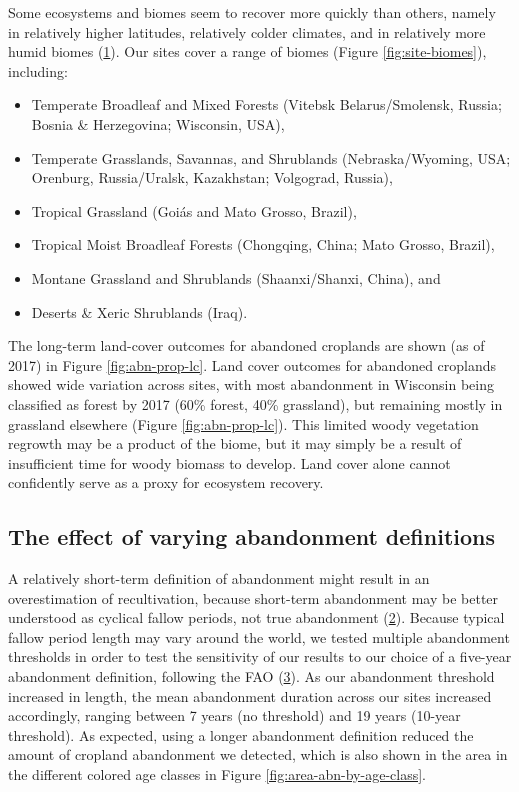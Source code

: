 \documentclass[9pt,lineno]{pnas-new}
\providecommand{\tightlist}{%
  \setlength{\itemsep}{0pt}\setlength{\parskip}{0pt}}
\begin{document}
Some ecosystems and biomes seem to recover more quickly than others, namely in relatively higher latitudes, relatively colder climates, and in relatively more humid biomes (\protect\hyperlink{ref-Prach2018}{1}).
Our sites cover a range of biomes (Figure \ref{fig:site-biomes}), including:

\begin{itemize}
\tightlist
\item
  Temperate Broadleaf and Mixed Forests (Vitebsk Belarus/Smolensk, Russia; Bosnia \& Herzegovina; Wisconsin, USA),
\item
  Temperate Grasslands, Savannas, and Shrublands (Nebraska/Wyoming, USA; Orenburg, Russia/Uralsk, Kazakhstan; Volgograd, Russia),
\item
  Tropical Grassland (Goiás and Mato Grosso, Brazil),
\item
  Tropical Moist Broadleaf Forests (Chongqing, China; Mato Grosso, Brazil),
\item
  Montane Grassland and Shrublands (Shaanxi/Shanxi, China), and
\item
  Deserts \& Xeric Shrublands (Iraq).
\end{itemize}

The long-term land-cover outcomes for abandoned croplands are shown (as of 2017) in Figure \ref{fig:abn-prop-lc}.
Land cover outcomes for abandoned croplands showed wide variation across sites, with most abandonment in Wisconsin being classified as forest by 2017 (60\% forest, 40\% grassland), but remaining mostly in grassland elsewhere (Figure \ref{fig:abn-prop-lc}).
This limited woody vegetation regrowth may be a product of the biome, but it may simply be a result of insufficient time for woody biomass to develop.
Land cover alone cannot confidently serve as a proxy for ecosystem recovery.

\hypertarget{abn-thresholds}{%
\subsection{The effect of varying abandonment definitions}\label{abn-thresholds}}

A relatively short-term definition of abandonment might result in an overestimation of recultivation, because short-term abandonment may be better understood as cyclical fallow periods, not true abandonment (\protect\hyperlink{ref-Munroe2013}{2}).
Because typical fallow period length may vary around the world, we tested multiple abandonment thresholds in order to test the sensitivity of our results to our choice of a five-year abandonment definition, following the FAO (\protect\hyperlink{ref-FAO2016}{3}).
As our abandonment threshold increased in length, the mean abandonment duration across our sites increased accordingly, ranging between 7 years (no threshold) and 19 years (10-year threshold).
As expected, using a longer abandonment definition reduced the amount of cropland abandonment we detected, which is also shown in the area in the different colored age classes in Figure \ref{fig:area-abn-by-age-class}.
\end{document}
